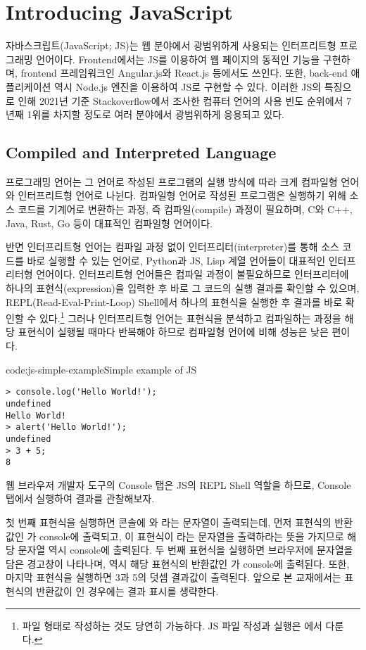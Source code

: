 \section{Introducing JavaScript}\label{sect:js-intro}

자바스크립트(JavaScript; JS)는 웹 분야에서 광범위하게 사용되는 인터프리트형 프로그래밍 언어이다. Frontend에서는 JS를 이용하여 웹 페이지의 동적인 기능을 구현하며, frontend 프레임워크인 Angular.js와 React.js 등에서도 쓰인다. 또한, back-end 애플리케이션 역시 Node.js 엔진을 이용하여 JS로 구현할 수 있다. 이러한 JS의 특징으로 인해 2021년 기준 Stackoverflow에서 조사한 컴퓨터 언어의 사용 빈도 순위에서 7년째 1위를 차지할 정도로 여러 분야에서 광범위하게 응용되고 있다.

\subsection*{Compiled and Interpreted Language}

프로그래밍 언어는 그 언어로 작성된 프로그램의 실행 방식에 따라 크게 컴파일형 언어와 인터프리트형 언어로 나뉜다. 컴파일형 언어로 작성된 프로그램은 실행하기 위해 소스 코드를 기계어로 변환하는 과정, 즉 컴파일(compile) 과정이 필요하며, C와 C++, Java, Rust, Go 등이 대표적인 컴파일형 언어이다.

반면 인터프리트형 언어는 컴파일 과정 없이 인터프리터(interpreter)를 통해 소스 코드를 바로 실행할 수 있는 언어로, Python과 JS, Lisp 계열 언어들이 대표적인 인터프리터형 언어이다. 인터프리트형 언어들은 컴파일 과정이 불필요하므로 인터프리터에 하나의 표현식(expression)을 입력한 후 바로 그 코드의 실행 결과를 확인할 수 있으며, REPL(Read-Eval-Print-Loop) Shell에서 하나의 표현식을 실행한 후 결과를 바로 확인할 수 있다.\footnote{파일 형태로 작성하는 것도 당연히 가능하다. JS 파일 작성과 실행은 에서 다룬다.} 그러나 인터프리트형 언어는 표현식을 분석하고 컴파일하는 과정을 해당 표현식이 실행될 때마다 반복해야 하므로 컴파일형 언어에 비해 성능은 낮은 편이다.

\begin{code}{code:js-simple-example}{Simple example of JS}
\begin{verbatim}
> console.log('Hello World!');
undefined
Hello World!
> alert('Hello World!');
undefined
> 3 + 5;
8
\end{verbatim}
\end{code}

웹 브라우저 개발자 도구의 Console 탭은 JS의 REPL Shell 역할을 하므로, Console 탭에서 \을 실행하여 결과를 관찰해보자.

첫 번째 표현식을 실행하면 콘솔에 와 라는 문자열이 출력되는데, 먼저 표현식의 반환값인 가 console에 출력되고, 이 표현식이 라는 문자열을 출력하라는 뜻을 가지므로 해당 문자열 역시 console에 출력된다. 두 번째 표현식을 실행하면 브라우저에  문자열을 담은 경고창이 나타나며, 역시 해당 표현식의 반환값인 가 console에 출력된다. 또한, 마지막 표현식을 실행하면 3과 5의 덧셈 결과값이 출력된다. 앞으로 본 교재에서는 표현식의 반환값이 인 경우에는 결과 표시를 생략한다.
